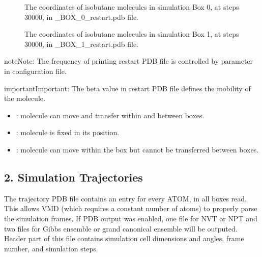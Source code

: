 \documentclass[letterpaper,10pt,english]{sphinxmanual}
\begin{document}
\begin{figure}[htbp]
\centering
\capstart

\noindent{}
\caption{The coordinates of isobutane molecules in simulation Box 0, at steps 30000, in \_BOX\_0\_restart.pdb file.}\label{\detokenize{output_file:id6}}\end{figure}

\begin{figure}[htbp]
\centering
\capstart

\noindent{}
\caption{The coordinates of isobutane molecules in simulation Box 1, at steps 30000, in \_BOX\_1\_restart.pdb file.}\label{\detokenize{output_file:id7}}\end{figure}

\begin{sphinxadmonition}{note}{Note:}
\sphinxAtStartPar
The frequency of printing restart PDB file is controlled by 
parameter in configuration file.
\end{sphinxadmonition}

\begin{sphinxadmonition}{important}{Important:}
\sphinxAtStartPar
The beta value in restart PDB file defines the mobility of the molecule.
\begin{itemize}
\item {} 
\sphinxAtStartPar
{}: molecule can move and transfer within and between boxes.

\item {} 
\sphinxAtStartPar
{}: molecule is fixed in its position.

\item {} 
\sphinxAtStartPar
{}: molecule can move within the box but cannot be transferred between boxes.

\end{itemize}
\end{sphinxadmonition}


\subsection{2.  Simulation Trajectories}
\label{\detokenize{output_file:simulation-trajectories}}
\sphinxAtStartPar
The trajectory PDB file contains an entry for every ATOM, in all boxes read. This allows VMD
(which requires a constant number of atoms) to properly parse the simulation frames. If PDB output was enabled,
one file for NVT or NPT and two files for Gibbs ensemble or grand canonical ensemble will be outputed.
Header part of this file contains simulation cell dimensions and angles, frame number, and simulation steps.
\end{document}
